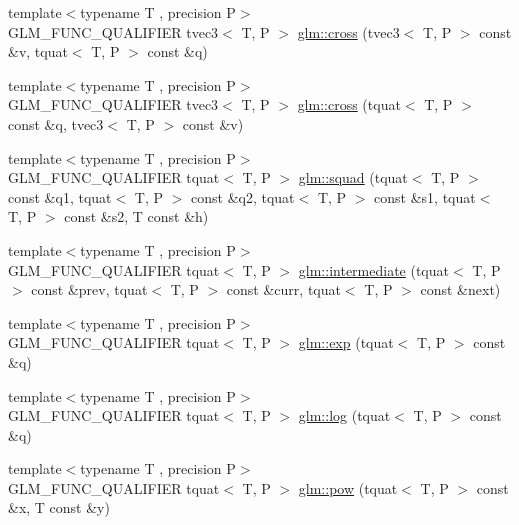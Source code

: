 \begin{DoxyCompactItemize}
\item 
{\footnotesize template$<$typename T , precision P$>$ }\\G\-L\-M\-\_\-\-F\-U\-N\-C\-\_\-\-Q\-U\-A\-L\-I\-F\-I\-E\-R tvec3$<$ T, P $>$ \hyperlink{group__gtx__quaternion_ga4bfe3c7770fc43d14b8ef0058c4a86b5}{glm\-::cross} (tvec3$<$ T, P $>$ const \&v, tquat$<$ T, P $>$ const \&q)
\item 
{\footnotesize template$<$typename T , precision P$>$ }\\G\-L\-M\-\_\-\-F\-U\-N\-C\-\_\-\-Q\-U\-A\-L\-I\-F\-I\-E\-R tvec3$<$ T, P $>$ \hyperlink{group__gtx__quaternion_ga33ecf8ba903eee5fc09f0fbfc0d5ca6b}{glm\-::cross} (tquat$<$ T, P $>$ const \&q, tvec3$<$ T, P $>$ const \&v)
\item 
{\footnotesize template$<$typename T , precision P$>$ }\\G\-L\-M\-\_\-\-F\-U\-N\-C\-\_\-\-Q\-U\-A\-L\-I\-F\-I\-E\-R tquat$<$ T, P $>$ \hyperlink{group__gtx__quaternion_gae75f537becdf2b1381b4482ec96e6c82}{glm\-::squad} (tquat$<$ T, P $>$ const \&q1, tquat$<$ T, P $>$ const \&q2, tquat$<$ T, P $>$ const \&s1, tquat$<$ T, P $>$ const \&s2, T const \&h)
\item 
{\footnotesize template$<$typename T , precision P$>$ }\\G\-L\-M\-\_\-\-F\-U\-N\-C\-\_\-\-Q\-U\-A\-L\-I\-F\-I\-E\-R tquat$<$ T, P $>$ \hyperlink{group__gtx__quaternion_ga56abae85b3669c866e91f3c57b298b9c}{glm\-::intermediate} (tquat$<$ T, P $>$ const \&prev, tquat$<$ T, P $>$ const \&curr, tquat$<$ T, P $>$ const \&next)
\item 
{\footnotesize template$<$typename T , precision P$>$ }\\G\-L\-M\-\_\-\-F\-U\-N\-C\-\_\-\-Q\-U\-A\-L\-I\-F\-I\-E\-R tquat$<$ T, P $>$ \hyperlink{group__gtx__quaternion_ga17295173d4c2b5ae49b84e9993b63a62}{glm\-::exp} (tquat$<$ T, P $>$ const \&q)
\item 
{\footnotesize template$<$typename T , precision P$>$ }\\G\-L\-M\-\_\-\-F\-U\-N\-C\-\_\-\-Q\-U\-A\-L\-I\-F\-I\-E\-R tquat$<$ T, P $>$ \hyperlink{group__gtx__quaternion_ga791f42e134bfe97fc9c96f4668dd7489}{glm\-::log} (tquat$<$ T, P $>$ const \&q)
\item 
{\footnotesize template$<$typename T , precision P$>$ }\\G\-L\-M\-\_\-\-F\-U\-N\-C\-\_\-\-Q\-U\-A\-L\-I\-F\-I\-E\-R tquat$<$ T, P $>$ \hyperlink{group__gtx__quaternion_ga42a0cf206c59eaeff4c67dd62e09a580}{glm\-::pow} (tquat$<$ T, P $>$ const \&x, T const \&y)

\end{DoxyCompactItemize}
